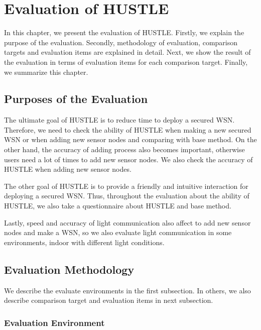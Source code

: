 \chapter{Evaluation of HUSTLE}\label{chap:evaluation}
In this chapter, we present the evaluation of HUSTLE. Firstly, we explain the purpose of the evaluation. Secondly, methodology of evaluation, comparison targets and evaluation items are explained in detail. Next, we show the result of the evaluation in terms of evaluation items for each comparison target. Finally, we summarize this chapter.
\clearpage
\section{Purposes of the Evaluation}\label{sec:evaluation_purpose}

The ultimate goal of HUSTLE is to reduce time to deploy a secured WSN. Therefore, we need to check the ability of HUSTLE when making a new secured WSN or when adding new sensor nodes and comparing with base method. On the other hand, the accuracy of adding process also becomes important, otherwise users need a lot of times to add new sensor nodes. We also check the accuracy of HUSTLE when adding new sensor nodes. 

The other goal of HUSTLE is to provide a friendly and intuitive interaction for deploying a secured WSN. Thus, throughout the evaluation about the ability of HUSTLE, we also take a questionnaire about HUSTLE and base method.

Lastly, speed and accuracy of light communication also affect to add new sensor nodes and make a WSN, so we also evaluate light communication in some environments, indoor with different light conditions.
\section{Evaluation Methodology}\label{sec:evaluation_methodology}

We describe the evaluate environments in the first subsection. In others, we also describe comparison target and evaluation items in next subsection.
\subsection{Evaluation Environment}\label{sec:evaluation_methodology_env}

